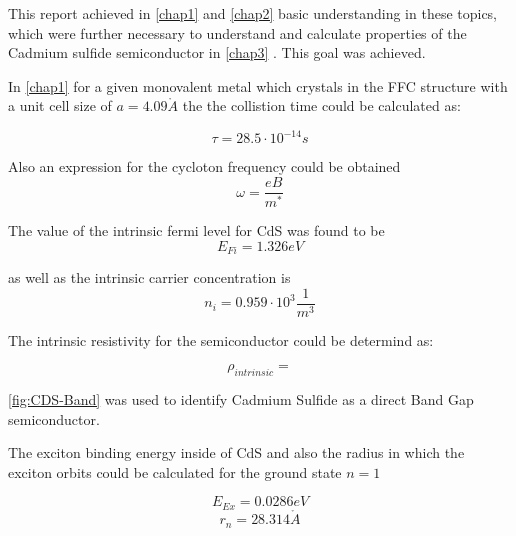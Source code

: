 


This report achieved in \ref{chap1}  and \ref{chap2} 
basic understanding in these topics, which were further necessary to 
understand and calculate properties of the Cadmium sulfide semiconductor in
\ref{chap3} . This goal was achieved.

In \ref{chap1}  for a given monovalent metal which crystals in the FFC structure
with a unit cell size of  $a = 4.09 \mathring{A}$ the the collistion
time could be calculated as:

$$\tau = 28.5 \cdot 10^{-14}s$$

Also an expression for the cycloton frequency could be obtained
$$\omega = \frac{eB}{m^*}$$


The value of the intrinsic fermi level for CdS was found to be
$$E_{Fi} = 1.326 eV$$

as well as the intrinsic carrier concentration is
$$n_i = 0.959 \cdot 10^3 \frac{1}{m^3}$$

The intrinsic resistivity for the semiconductor could be determind 
as:

$$\rho_{intrinsic} = $$

\autoref{fig:CDS-Band} was used to identify Cadmium Sulfide
as a direct Band Gap semiconductor.

The exciton binding energy inside of CdS and also the radius in 
which the exciton orbits could be calculated for the ground state
$n=1$

$$E_{Ex} = 0.0286 eV$$
$$r_n = 28.314 \mathring{A}$$